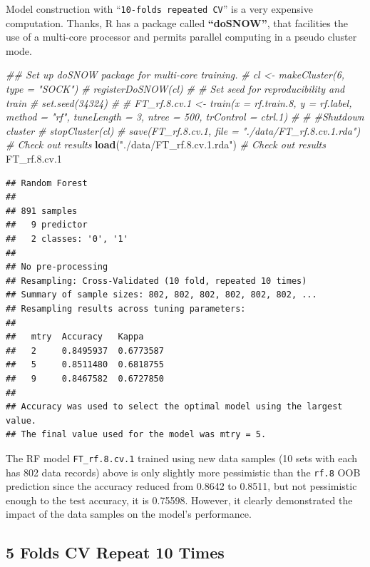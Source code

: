 \documentclass[
]{book}
\newenvironment{Shaded}{\begin{snugshade}}{\end{snugshade}}
\newcommand{\CommentTok}[1]{\textcolor[rgb]{0.56,0.35,0.01}{\textit{#1}}}
\newcommand{\FloatTok}[1]{\textcolor[rgb]{0.00,0.00,0.81}{#1}}
\newcommand{\KeywordTok}[1]{\textcolor[rgb]{0.13,0.29,0.53}{\textbf{#1}}}
\newcommand{\NormalTok}[1]{#1}
\newcommand{\StringTok}[1]{\textcolor[rgb]{0.31,0.60,0.02}{#1}}
\begin{document}
Model construction with ``\texttt{10-folds\ repeated\ CV}'' is a very expensive computation. Thanks, R has a package called \textbf{``doSNOW''}, that facilities the use of a multi-core processor and permits parallel computing in a pseudo cluster mode.

\begin{Shaded}
\begin{Highlighting}[]
\CommentTok{## Set up doSNOW package for multi-core training. }
\CommentTok{# cl <- makeCluster(6, type = "SOCK")}
\CommentTok{# registerDoSNOW(cl)}
\CommentTok{# # Set seed for reproducibility and train}
\CommentTok{# set.seed(34324)}
\CommentTok{# }
\CommentTok{# FT_rf.8.cv.1 <- train(x = rf.train.8, y = rf.label, method = "rf", tuneLength = 3, ntree = 500, trControl = ctrl.1)}
\CommentTok{# }
\CommentTok{# #Shutdown cluster}
\CommentTok{# stopCluster(cl)}
\CommentTok{# save(FT_rf.8.cv.1, file = "./data/FT_rf.8.cv.1.rda")}
\CommentTok{# Check out results}
\KeywordTok{load}\NormalTok{(}\StringTok{"./data/FT_rf.8.cv.1.rda"}\NormalTok{)}
\CommentTok{# Check out results}
\NormalTok{FT_rf.}\FloatTok{8.}\NormalTok{cv}\FloatTok{.1} 
\end{Highlighting}
\end{Shaded}

\begin{verbatim}
## Random Forest 
## 
## 891 samples
##   9 predictor
##   2 classes: '0', '1' 
## 
## No pre-processing
## Resampling: Cross-Validated (10 fold, repeated 10 times) 
## Summary of sample sizes: 802, 802, 802, 802, 802, 802, ... 
## Resampling results across tuning parameters:
## 
##   mtry  Accuracy   Kappa    
##   2     0.8495937  0.6773587
##   5     0.8511480  0.6818755
##   9     0.8467582  0.6727850
## 
## Accuracy was used to select the optimal model using the largest value.
## The final value used for the model was mtry = 5.
\end{verbatim}

The RF model \texttt{FT\_rf.8.cv.1} trained using new data samples (10 sets with each has 802 data records) above is only slightly more pessimistic than the \texttt{rf.8} OOB prediction since the accuracy reduced from 0.8642 to 0.8511, but not pessimistic enough to the test accuracy, it is 0.75598. However, it clearly demonstrated the impact of the data samples on the model's performance.

\hypertarget{folds-cv-repeat-10-times-1}{%
\subsection*{5 Folds CV Repeat 10 Times}\label{folds-cv-repeat-10-times-1}}
\end{document}
